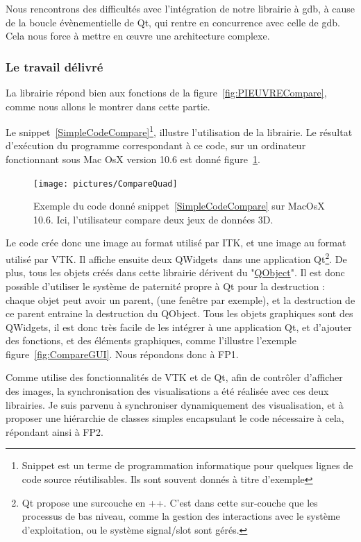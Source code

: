 Nous rencontrons des difficultés avec l'intégration de notre librairie à gdb, à cause de la boucle évènementielle de Qt, qui rentre en concurrence avec celle de gdb. Cela nous force à mettre en œuvre une architecture complexe.

\subsubsection*{Le travail délivré}
La librairie répond bien aux fonctions de la figure~\ref{fig:PIEUVRECompare}, comme nous allons le montrer dans cette partie.

Le {snippet~\ref{SimpleCodeCompare}}\footnote{Snippet est un terme de programmation informatique pour quelques lignes de code source réutilisables. Ils sont souvent donnés à titre d'exemple}, illustre l'utilisation de la librairie. Le résultat d'exécution du programme correspondant à ce code, sur un ordinateur fonctionnant sous Mac OsX version 10.6 est donné figure~\ref{fig:CompareQuad}.

\begin{figure}[h]
\begin{center}
\leavevmode
\texttt{[image: pictures/CompareQuad]}
\end{center}
\caption{Exemple du code donné snippet~\ref{SimpleCodeCompare} sur MacOsX 10.6. Ici, l'utilisateur compare deux jeux de données 3D.}
\label{fig:CompareQuad}
\end{figure}

Le code crée donc une image au format utilisé par ITK, et une image au format utilisé par VTK. Il affiche ensuite deux QWidgets\ dans une application Qt\footnote{Qt propose une surcouche en {\C++}. C'est dans cette sur-couche que les processus de bas niveau, comme la gestion des interactions avec le système d'exploitation, ou le système signal/slot sont gérés.}. De plus, tous les objets créés dans cette librairie dérivent du "\href{http://doc.qt.nokia.com/4.6/qobject.html}{QObject}".
Il est donc possible d'utiliser le système de paternité propre à Qt pour la destruction : chaque objet peut avoir un parent, (une fenêtre par exemple),
et la destruction de ce parent entraine la destruction du QObject. Tous les objets graphiques sont des QWidgets, il est donc très facile de les intégrer à une application Qt, et d'ajouter des fonctions, et des éléments graphiques, comme l'illustre l'exemple figure~\ref{fig:CompareGUI}. Nous répondons donc à FP1.

Comme {\gofigure} utilise des fonctionnalités de VTK et de Qt, afin de contrôler d'afficher des images, la synchronisation des visualisations a été réalisée avec ces deux librairies.
Je suis parvenu à synchroniser dynamiquement des visualisation, et à proposer une hiérarchie de classes simples encapsulant le code nécessaire à cela, répondant ainsi à FP2.


